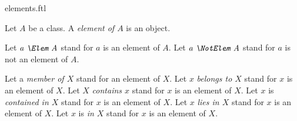 \documentclass{stex}
\begin{document}
\begin{smodule}{elements.ftl}



\begin{fakeforthel}
  \begin{signature}
    Let $A$ be a class.
    A \emph{element of $A$} is an object.
  \end{signature}
\end{fakeforthel}

\begin{forthel}
  \begin{convention}
    Let $\emph{a \Elem A}$ stand for $a$ is an element of $A$.
    Let $\emph{a \NotElem A}$ stand for $a$ is not an element of $A$.

    Let a \emph{member of $X$} stand for an element of $X$.
    Let $x$ \emph{belongs to $X$} stand for $x$ is an element of $X$.
    Let $X$ \emph{contains $x$} stand for $x$ is an element of $X$.
    Let $x$ is \emph{contained in $X$} stand for $x$ is an element of $X$.
    Let $x$ \emph{lies in $X$} stand for $x$ is an element of $X$.
    Let $x$ is \emph{in $X$} stand for $x$ is an element of $X$.
  \end{convention}
\end{forthel}

\end{smodule}
\end{document}
